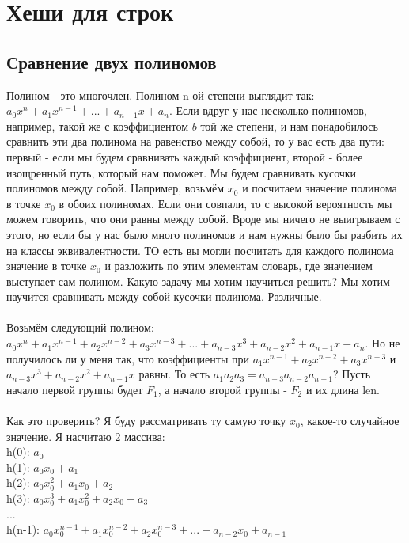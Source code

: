 \documentclass[a4paper,12pt]{article}
\begin{document}
\newpage
\section{Хеши для строк}
\subsection{Сравнение двух полиномов}
Полином - это многочлен. Полином n-ой степени выглядит так: $a_{0}x^{n} + a_{1}x^{n-1} + ... + a_{n-1}x + a_{n}$. Если вдруг у нас несколько полиномов, например, такой же с коэффициентом $b$ той же степени, и нам понадобилось сравнить эти два полинома на равенство между собой, то у вас есть два пути: первый - если мы будем сравнивать каждый коэффициент, второй - более изощренный путь, который нам поможет. Мы будем сравнивать кусочки полиномов между собой. Например, возьмём $x_0$ и посчитаем значение полинома в точке $x_0$ в обоих полиномах. Если они совпали, то с высокой вероятность мы можем говорить, что они равны между собой. Вроде мы ничего не выигрываем с этого, но если бы у нас было много полиномов и нам нужны было бы разбить их на классы эквивалентности. ТО есть вы могли посчитать для каждого полинома значение в точке $x_0$ и разложить по этим элементам словарь, где значением выступает сам полином. Какую задачу мы хотим научиться решить? Мы хотим научится сравнивать между собой кусочки полинома. Различные. \\ \\
Возьмём следующий полином: $a_{0}x^{n} + a_{1}x^{n-1} + a_{2}x^{n-2} + a_{3}x^{n-3} +... + a_{n-3}x^{3} + a_{n-2}x^{2} + a_{n-1}x + a_{n}$. Но не получилось ли у меня так, что коэффициенты при $a_{1}x^{n-1} + a_{2}x^{n-2} + a_{3}x^{n-3}$ и $a_{n-3}x^{3} + a_{n-2}x^{2} + a_{n-1}x$ равны. То есть $a_{1}a_{2}a_{3} = a_{n-3}a_{n-2}a_{n-1}$? Пусть начало первой группы будет $F_1$, а начало второй группы - $F_2$ и их длина len. \\ \\
Как это проверить? Я буду рассматривать ту самую точку $x_{0}$, какое-то случайное значение. Я насчитаю 2 массива:\\
h(0): $a_{0}$\\
h(1): $a_{0}x_{0} + a_1$\\
h(2): $a_{0}x_{0}^{2} + a_{1}x_{0} + a_{2}$\\
h(3): $a_{0}x_{0}^{3} + a_{1}x_{0}^{2} + a_{2}x_{0} + a_{3}$\\
...\\
h(n-1): $a_{0}x_{0}^{n-1} + a_{1}x_{0}^{n-2} + a_{2}x_{0}^{n-3} +... + a_{n-2}x_{0} + a_{n-1}$\\
\end{document}
